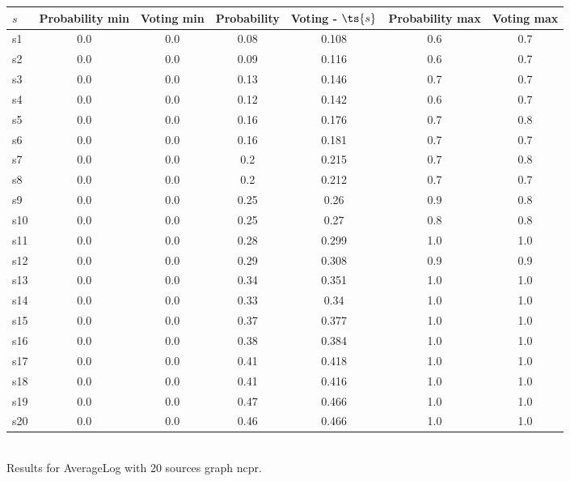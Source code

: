 \documentclass{article}
\begin{document}
\noindent\begin{tabular}{|l|c|c|c|c|c|c|}
\hline
$s$& Probability min & Voting min & Probability & Voting - $\ts{s}$ & Probability max & Voting max\\
\hline
s1 &0.0 & 0.0 & 0.08 & 0.108 & 0.6 & 0.7\\
\hline
s2 &0.0 & 0.0 & 0.09 & 0.116 & 0.6 & 0.7\\
\hline
s3 &0.0 & 0.0 & 0.13 & 0.146 & 0.7 & 0.7\\
\hline
s4 &0.0 & 0.0 & 0.12 & 0.142 & 0.6 & 0.7\\
\hline
s5 &0.0 & 0.0 & 0.16 & 0.176 & 0.7 & 0.8\\
\hline
s6 &0.0 & 0.0 & 0.16 & 0.181 & 0.7 & 0.7\\
\hline
s7 &0.0 & 0.0 & 0.2 & 0.215 & 0.7 & 0.8\\
\hline
s8 &0.0 & 0.0 & 0.2 & 0.212 & 0.7 & 0.7\\
\hline
s9 &0.0 & 0.0 & 0.25 & 0.26 & 0.9 & 0.8\\
\hline
s10 &0.0 & 0.0 & 0.25 & 0.27 & 0.8 & 0.8\\
\hline
s11 &0.0 & 0.0 & 0.28 & 0.299 & 1.0 & 1.0\\
\hline
s12 &0.0 & 0.0 & 0.29 & 0.308 & 0.9 & 0.9\\
\hline
s13 &0.0 & 0.0 & 0.34 & 0.351 & 1.0 & 1.0\\
\hline
s14 &0.0 & 0.0 & 0.33 & 0.34 & 1.0 & 1.0\\
\hline
s15 &0.0 & 0.0 & 0.37 & 0.377 & 1.0 & 1.0\\
\hline
s16 &0.0 & 0.0 & 0.38 & 0.384 & 1.0 & 1.0\\
\hline
s17 &0.0 & 0.0 & 0.41 & 0.418 & 1.0 & 1.0\\
\hline
s18 &0.0 & 0.0 & 0.41 & 0.416 & 1.0 & 1.0\\
\hline
s19 &0.0 & 0.0 & 0.47 & 0.466 & 1.0 & 1.0\\
\hline
s20 &0.0 & 0.0 & 0.46 & 0.466 & 1.0 & 1.0\\
\hline
\end{tabular}\\

\noindent Results for AverageLog with 20 sources graph ncpr.
\end{document}
